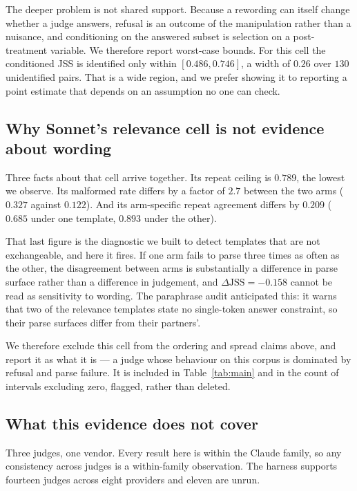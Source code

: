 \documentclass[11pt]{article}          %
\begin{document}
The deeper problem is not shared support. Because a rewording can itself change
whether a judge answers, refusal is an outcome of the manipulation rather than a
nuisance, and conditioning on the answered subset is selection on a
post-treatment variable. We therefore report
worst-case bounds. For this cell the conditioned JSS is identified only within
$[0.486, 0.746]$, a width of $0.26$ over $130$ unidentified pairs. That is a wide
region, and we prefer showing it to reporting a point estimate that depends on an
assumption no one can check.

\subsection{Why Sonnet's relevance cell is not evidence about wording}
\label{sec:results-sonnet-relevance}

Three facts about that cell arrive together. Its repeat ceiling is $0.789$, the
lowest we observe. Its malformed rate differs by a factor of $2.7$ between the
two arms ($0.327$ against $0.122$). And its arm-specific repeat agreement differs
by $0.209$ ($0.685$ under one template, $0.893$ under the other).

That last figure is the diagnostic we built to detect templates that are not
exchangeable, and here it fires. If one arm fails to parse three times as often
as the other, the disagreement between arms is substantially a difference in
parse surface rather than a difference in judgement, and
$\Delta\mathrm{JSS}=-0.158$ cannot be read as sensitivity to wording. The
paraphrase audit anticipated this: it warns that two of the relevance templates
state no single-token answer constraint, so their parse surfaces differ from
their partners'.

We therefore exclude this cell from the ordering and spread claims above, and
report it as what it is --- a judge whose behaviour on this corpus is dominated
by refusal and parse failure. It is included in Table~\ref{tab:main} and in the
count of intervals excluding zero, flagged, rather than deleted.

\subsection{What this evidence does not cover}
\label{sec:results-limits}

Three judges, one vendor. Every result here is within the Claude family, so any
consistency across judges is a within-family observation. The harness supports
fourteen judges across eight providers and eleven are unrun.
\end{document}
